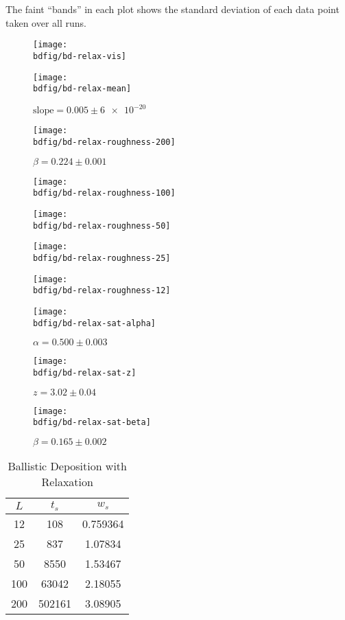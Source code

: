 \documentclass[12pt,a4paper]{article}
\newcommand{\bdfig}{../fig/ballistic-deposition}
\begin{document}
    The faint \enquote{bands} in each plot shows the standard deviation of each data point taken over all runs.
    \begin{figure}
        \centering
        \texttt{[image: \\bdfig/bd-relax-vis]}
    \end{figure}
    \begin{figure}
        \centering
        \texttt{[image: \\bdfig/bd-relax-mean]}
        \caption{$\text{slope}=0.005\pm\num{6e-20}$}
    \end{figure}
    \begin{figure}
        \centering
        \texttt{[image: \\bdfig/bd-relax-roughness-200]}
        \caption{$\beta=0.224\pm0.001$}
    \end{figure}
    \begin{figure}
        \centering
        \texttt{[image: \\bdfig/bd-relax-roughness-100]}
    \end{figure}
    \begin{figure}
        \centering
        \texttt{[image: \\bdfig/bd-relax-roughness-50]}
    \end{figure}
    \begin{figure}
        \centering
        \texttt{[image: \\bdfig/bd-relax-roughness-25]}
    \end{figure}
    \begin{figure}
        \centering
        \texttt{[image: \\bdfig/bd-relax-roughness-12]}
    \end{figure}
    \begin{figure}
        \centering
        \texttt{[image: \\bdfig/bd-relax-sat-alpha]}
        \caption{$\alpha = 0.500\pm0.003$}
    \end{figure}
    \begin{figure}
        \centering
        \texttt{[image: \\bdfig/bd-relax-sat-z]}
        \caption{$z = 3.02\pm0.04$}
    \end{figure}
    \begin{figure}
        \centering
        \texttt{[image: \\bdfig/bd-relax-sat-beta]}
        \caption{$\beta = 0.165\pm0.002$}
    \end{figure}
    \restoregeometry
    \begin{table}[htb!]
        \centering
        \caption{Ballistic Deposition with Relaxation}
        \begin{tabular}{|c|c|c|}
            \hline
            $L$ & $t_s$ & $w_s$ \\
            \hline
            12 & 108 & 0.759364 \\
            \hline
            25 & 837 & 1.07834 \\
            \hline
            50 & 8550 & 1.53467 \\
            \hline
            100 & 63042 & 2.18055 \\
            \hline
            200 & 502161 & 3.08905 \\
            \hline
        \end{tabular}
    \end{table}
\end{document}
